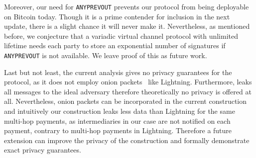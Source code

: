   Moreover, our need for \texttt{ANYPREVOUT} prevents our protocol from being
  deployable on Bitcoin today. Though it is a prime contender for inclusion
  in the next update, there is a slight chance it will never make it.
  Nevertheless, as mentioned before, we conjecture that a variadic virtual
  channel protocol with unlimited lifetime needs each party to store an
  exponential number of signatures if \texttt{ANYPREVOUT} is not available. We
  leave proof of this as future work.

  Last but not least, the current analysis gives no privacy guarantees for the
  protocol, as it does not employ onion packets~\cite{sphinx} like Lightning.
  Furthermore, \fchan leaks all messages to the ideal adversary therefore
  theoretically no privacy is offered at all. Nevertheless, onion packets can be
  incorporated in the current construction and intuitively our construction
  leaks less data than Lightning for the same multi-hop payments, as
  intermediaries in our case are not notified on each payment, contrary to
  multi-hop payments in Lightning. Therefore a future extension can improve the
  privacy of the construction and formally demonstrate exact privacy guarantees.
